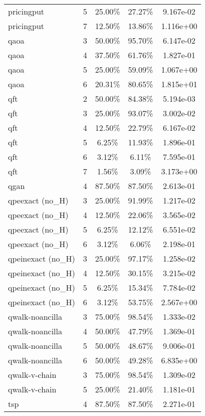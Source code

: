 \begin{table}[ht!]
\begin{tabular}{lc||ccc}
pricingput & 5 & 25.00\% & 27.27\% & 9.167e-02 \\
pricingput & 7 & 12.50\% & 13.86\% & 1.116e+00 \\
\midrule
qaoa & 3 & 50.00\% & 95.70\% & 6.147e-02 \\
qaoa & 4 & 37.50\% & 61.76\% & 1.827e-01 \\
qaoa & 5 & 25.00\% & 59.09\% & 1.067e+00 \\
qaoa & 6 & 20.31\% & 80.65\% & 1.815e+01 \\
\midrule
qft & 2 & 50.00\% & 84.38\% & 5.194e-03 \\
qft & 3 & 25.00\% & 93.07\% & 3.002e-02 \\
qft & 4 & 12.50\% & 22.79\% & 6.167e-02 \\
qft & 5 & 6.25\% & 11.93\% & 1.896e-01 \\
qft & 6 & 3.12\% & 6.11\% & 7.595e-01 \\
qft & 7 & 1.56\% & 3.09\% & 3.173e+00 \\
\midrule
qgan & 4 & 87.50\% & 87.50\% & 2.613e-01 \\
\midrule
qpeexact (no\_H) & 3 & 25.00\% & 91.99\% & 1.217e-02 \\
qpeexact (no\_H) & 4 & 12.50\% & 22.06\% & 3.565e-02 \\
qpeexact (no\_H) & 5 & 6.25\% & 12.12\% & 6.551e-02 \\
qpeexact (no\_H) & 6 & 3.12\% & 6.06\% & 2.198e-01 \\
\midrule
qpeinexact (no\_H) & 3 & 25.00\% & 97.17\% & 1.258e-02 \\
qpeinexact (no\_H) & 4 & 12.50\% & 30.15\% & 3.215e-02 \\
qpeinexact (no\_H) & 5 & 6.25\% & 15.34\% & 7.784e-02 \\
qpeinexact (no\_H) & 6 & 3.12\% & 53.75\% & 2.567e+00 \\
\midrule
qwalk-noancilla & 3 & 75.00\% & 98.54\% & 1.333e-02 \\
qwalk-noancilla & 4 & 50.00\% & 47.79\% & 1.369e-01 \\
qwalk-noancilla & 5 & 50.00\% & 48.67\% & 9.006e-01 \\
qwalk-noancilla & 6 & 50.00\% & 49.28\% & 6.835e+00 \\
\midrule
qwalk-v-chain & 3 & 75.00\% & 98.54\% & 1.309e-02 \\
qwalk-v-chain & 5 & 25.00\% & 21.40\% & 1.181e-01 \\
\midrule
tsp & 4 & 87.50\% & 87.50\% & 2.271e-01 \\
\bottomrule
\end{tabular}
\end{table}
